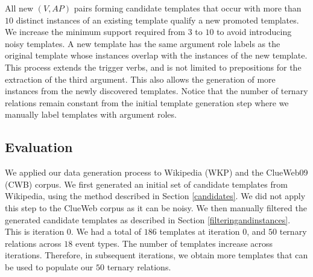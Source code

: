  All new $(V,AP)$ pairs forming candidate templates that occur with more than $10$ distinct instances of an existing template qualify  a new promoted  templates. We increase the minimum support required from $3$ to $10$ to avoid introducing noisy templates.
A new template has  the same argument role labels as the original template whose instances overlap with the instances of the new template.  This process extends the trigger verbs, and is not  limited to prepositions for the extraction of the third argument.   This also allows the generation of more instances from the newly discovered templates. Notice that the number of ternary relations  remain constant from the initial template generation step where we manually label templates with argument roles.
 

%


\subsection{Evaluation}
We applied our data generation process to  Wikipedia (WKP) and the  ClueWeb09 (CWB) corpus. 
We first generated an initial set of candidate  templates from Wikipedia, using the method described in Section \ref{candidates}. We did not apply this step to the ClueWeb corpus as it can be noisy. We then manually filtered the generated candidate templates as described in Section \ref{filteringandinstances}. This is  iteration $0$. We had a total of $186$ templates at iteration $0$, and  $50$ ternary relations across $18$ event types.  The number of templates increase across iterations.
 Therefore, in subsequent iterations, we obtain more templates that can be used to populate our $50$ ternary relations. 

